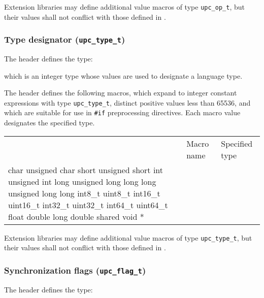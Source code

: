 \np Extension libraries may define additional value macros of type {\tt upc\_op\_t},
but their values shall not conflict with those defined in \header.

\subsubsection{Type designator ({\tt upc\_type\_t})}
\label{upc-type-t}

\npf The \header header defines the type:


which is an integer type whose values are used to designate a language type.

\np The \header header defines the following macros, 
which expand to integer constant expressions with type {\tt upc\_type\_t},
distinct positive values less than 65536, and which are suitable for use 
in {\tt \#if} preprocessing directives. 
Each macro value designates the specified type.

\begin{tabular}[b]{ p{30pt} l l }
& Macro name & Specified type\\
\cline{2-3}
{CHAR}	{char}
{UCHAR}	{unsigned char}
{SHORT}	{short}
{USHORT}	{unsigned short}
{INT}	{int}
{UINT}	{unsigned int}
{LONG}	{long}
{ULONG}	{unsigned long}
{LLONG}	{long long}
{ULLONG}	{unsigned long long}
{INT8}	{int8\_t}
{UINT8}	{uint8\_t}
{INT16}	{int16\_t}
{UINT16}	{uint16\_t}
{INT32}	{int32\_t}
{UINT32}	{uint32\_t}
{INT64}	{int64\_t}
{UINT64}	{uint64\_t}
{FLOAT}	{float}
{DOUBLE}	{double}
{LDOUBLE}	{long double}
{PTS}	{shared void *}
\end{tabular}

\np Extension libraries may define additional value macros of type {\tt upc\_type\_t},
but their values shall not conflict with those defined in \header.

\subsubsection{Synchronization flags ({\tt upc\_flag\_t})}
\label{upc-flag-t}

\npf The \header header defines the type:


